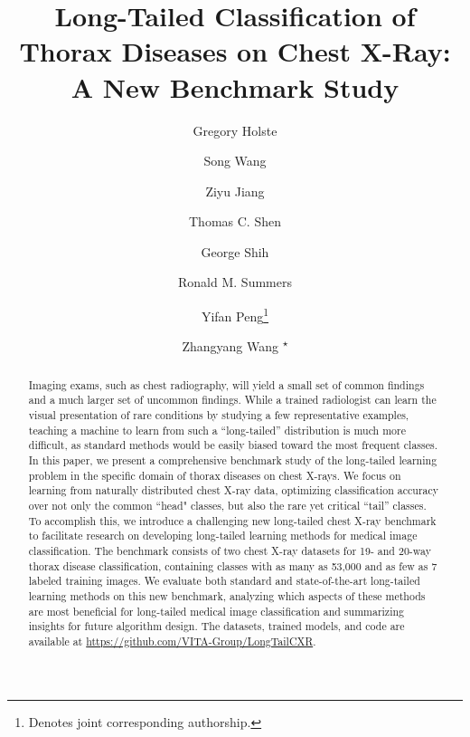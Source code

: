 \documentclass[runningheads]{llncs}
\begin{document}
\raggedbottom

\title{Long-Tailed Classification of Thorax Diseases on Chest X-Ray: A New Benchmark Study}
\author{Gregory Holste \and
Song Wang \and
Ziyu Jiang \and
Thomas C. Shen \and
George Shih \and
Ronald M. Summers \and
Yifan Peng\thanks{Denotes joint corresponding authorship.} \and
Zhangyang Wang \textsuperscript{$\star$}}

\maketitle              

\begin{abstract}
Imaging exams, such as chest radiography, will yield a small set of common findings and a much larger set of uncommon findings. While a trained radiologist can learn the visual presentation of rare conditions by studying a few representative examples, teaching a machine to learn from such a “long-tailed” distribution is much more difficult, as standard methods would be easily biased toward the most frequent classes. In this paper, we present a comprehensive benchmark study of the long-tailed learning problem in the specific domain of thorax diseases on chest X-rays. We focus on learning from naturally distributed chest X-ray data, optimizing classification accuracy over not only the common ``head" classes, but also the rare yet critical ``tail” classes. To accomplish this, we introduce a challenging new long-tailed chest X-ray benchmark to facilitate research on developing long-tailed learning methods for medical image classification. The benchmark consists of two chest X-ray datasets for 19- and 20-way thorax disease classification, containing classes with as many as 53,000 and as few as 7 labeled training images. We evaluate both standard and state-of-the-art long-tailed learning methods on this new benchmark, analyzing which aspects of these methods are most beneficial for long-tailed medical image classification and summarizing insights for future algorithm design. The datasets, trained models, and code are available at \url{https://github.com/VITA-Group/LongTailCXR}.



\end{abstract}
\end{document}
